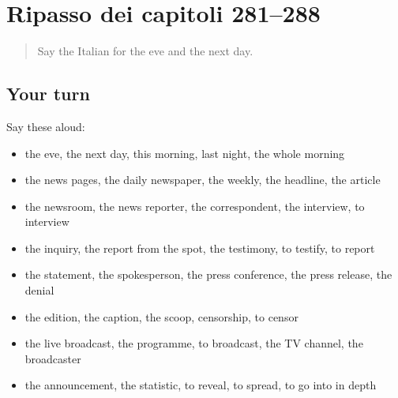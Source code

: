 \section[(dialogue)]{Ripasso dei capitoli 281–288}

\label{lesson:IT-R288-ripasso-281-288}



\begin{quote}
Say the Italian for the eve and the next day.
\end{quote}

\subsection*{Your turn}
Say these aloud:

\begin{itemize}
\raggedright
  \item the eve, the next day, this morning, last night, the whole morning
  \item the news pages, the daily newspaper, the weekly, the headline, the article
  \item the newsroom, the news reporter, the correspondent, the interview, to interview
  \item the inquiry, the report from the spot, the testimony, to testify, to report
  \item the statement, the spokesperson, the press conference, the press release, the denial
  \item the edition, the caption, the scoop, censorship, to censor
  \item the live broadcast, the programme, to broadcast, the TV channel, the broadcaster
  \item the announcement, the statistic, to reveal, to spread, to go into in depth
\end{itemize}

